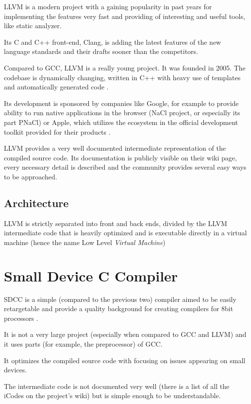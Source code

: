     LLVM is a modern project with a gaining popularity in past years for implementing the features very fast and providing of interesting and useful tools, like static analyzer.

    Its C and C++ front-end, Clang, is adding the latest features of the new language standards and their drafts sooner than the competitors.

    Compared to GCC, LLVM is a really young project. It was founded in 2005. The codebase is dynamically changing, written in C++ with heavy use of templates and automatically generated code \cite{LlvmWeb}.

    Its development is sponsored by companies like Google, for example to provide ability to run native applications in the browser (NaCl project, or especially its part PNaCl) or Apple, which utilizes the ecosystem in the official development toolkit provided for their products \cite{LlvmApple} \cite{LlvmNacl}.

    LLVM provides a very well documented intermediate representation of the compiled source code. Its documentation is publicly visible on their wiki page, every necessary detail is described and the community provides several easy ways to be approached.

        \subsection{Architecture}

        LLVM is strictly separated into front and back ends, divided by the LLVM intermediate code that is heavily optimized and is executable directly in a virtual machine (hence the name Low Level \emph{Virtual Machine})

    \section{Small Device C Compiler}\label{sdcc}

    SDCC is a simple (compared to the previous two) compiler aimed to be easily retargetable and provide a quality background for creating compilers for 8bit processors \cite{SdccWeb}.

    It is not a very large project (especially when compared to GCC and LLVM) and it uses parts (for example, the preprocessor) of GCC.

    It optimizes the compiled source code with focusing on issues appearing on small devices.

    The intermediate code is not documented very well (there is a list of all the iCodes on the project's wiki) but is simple enough to be understandable.

